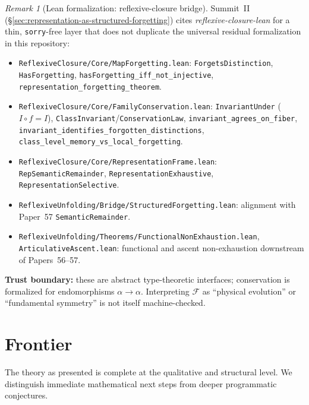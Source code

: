 \documentclass[11pt,a4paper]{article}
\theoremstyle{plain}
\theoremstyle{definition}
\theoremstyle{remark}
\newtheorem{remark}[theorem]{Remark}
\begin{document}
\begin{remark}[Lean formalization: reflexive-closure bridge]\label{rem:structured-forgetting-lean}
Summit~II (\S\ref{sec:representation-as-structured-forgetting}) cites \emph{reflexive-closure-lean} for a thin, \texttt{sorry}-free layer that does not duplicate the universal residual formalization in this repository:
\leavevmode\par\begin{itemize}[nosep,leftmargin=*,before=\raggedright]
\item \texttt{ReflexiveClosure/\allowbreak{}Core/\allowbreak{}MapForgetting.lean}: \texttt{ForgetsDistinction}, \texttt{HasForgetting}, \texttt{hasForgetting\_iff\_not\_injective}, \texttt{representation\_forgetting\_theorem}.
\item \texttt{ReflexiveClosure/\allowbreak{}Core/\allowbreak{}FamilyConservation.lean}: \texttt{InvariantUnder} ($I \circ f = I$), \texttt{ClassInvariant}/\texttt{ConservationLaw}, \texttt{invariant\_agrees\_on\_fiber}, \texttt{invariant\_identifies\_forgotten\_distinctions}, \texttt{class\_level\_memory\_vs\_local\_forgetting}.
\item \texttt{ReflexiveClosure/\allowbreak{}Core/\allowbreak{}RepresentationFrame.lean}: \texttt{RepSemanticRemainder}, \texttt{RepresentationExhaustive}, \texttt{RepresentationSelective}.
\item \texttt{ReflexiveUnfolding/\allowbreak{}Bridge/\allowbreak{}StructuredForgetting.lean}: alignment with Paper~57 \texttt{SemanticRemainder}.
\item \texttt{ReflexiveUnfolding/\allowbreak{}Theorems/\allowbreak{}FunctionalNonExhaustion.lean}, \texttt{ArticulativeAscent.lean}: functional and ascent non-exhaustion downstream of Papers~56--57.
\end{itemize}
\textbf{Trust boundary:} these are abstract type-theoretic interfaces; conservation is formalized for endomorphisms $\alpha \to \alpha$. Interpreting $\mathcal{F}$ as ``physical evolution'' or ``fundamental symmetry'' is not itself machine-checked.
\end{remark}

\section{Frontier}\label{sec:frontier}

The theory as presented is complete at the qualitative and structural level.
We distinguish immediate mathematical next steps from deeper programmatic
conjectures.
\end{document}
